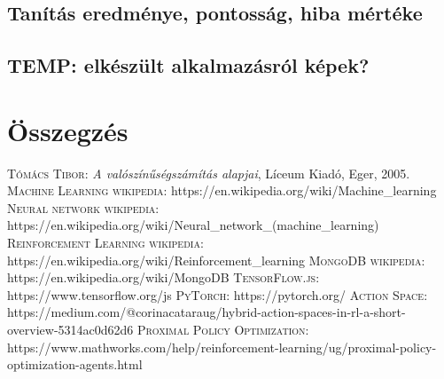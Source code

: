 \documentclass[
]{thesis-ekf}
\theoremstyle{definition}
\theoremstyle{remark}
\begin{document}
\section{Tanítás eredménye, pontosság, hiba mértéke}

\section{TEMP: elkészült alkalmazásról képek?}

\chapter*{Összegzés}


\begin{thebibliography}{2}
\textsc{Tómács Tibor}: \emph{A valószínűségszámítás alapjai}, Líceum Kiadó, Eger, 2005.
\textsc{Machine Learning wikipedia}: https://en.wikipedia.org/wiki/Machine\_learning
\textsc{Neural network wikipedia}: https://en.wikipedia.org/wiki/Neural\_network\_(machine\_learning)
\textsc{Reinforcement Learning wikipedia}: https://en.wikipedia.org/wiki/Reinforcement\_learning
\textsc{MongoDB wikipedia}: https://en.wikipedia.org/wiki/MongoDB
\textsc{TensorFlow.js}: https://www.tensorflow.org/js
\textsc{PyTorch}: https://pytorch.org/
\textsc{Action Space}: https://medium.com/@corinacataraug/hybrid-action-spaces-in-rl-a-short-overview-5314ac0d62d6
\textsc{Proximal Policy Optimization}: https://www.mathworks.com/help/reinforcement-learning/ug/proximal-policy-optimization-agents.html
\end{thebibliography}


\end{document}
